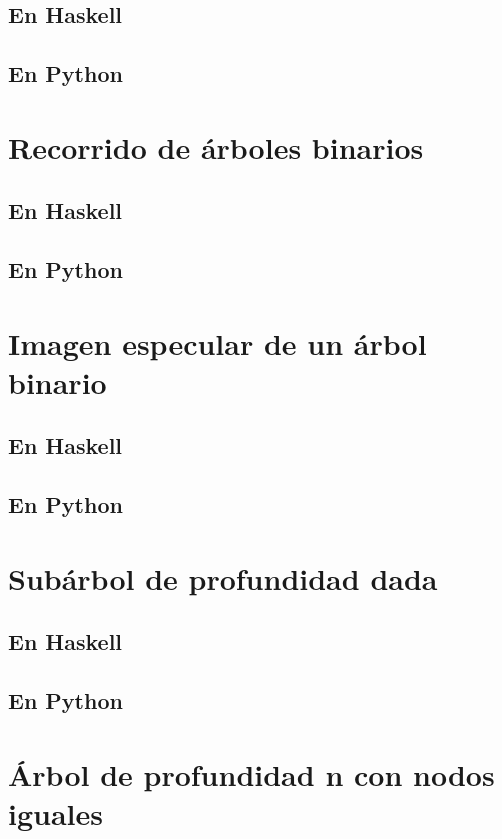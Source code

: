 \documentclass[a4paper,12pt,twoside]{book}
\begin{document}
\subsection{En Haskell}
\subsection*{En Python}

\section{Recorrido de árboles binarios}
\subsection{En Haskell}
\subsection{En Python}

\section{Imagen especular de un árbol binario}
\subsection{En Haskell}
\subsection{En Python}

\section{Subárbol de profundidad dada}
\subsection{En Haskell}
\subsection{En Python}

\section{Árbol de profundidad n con nodos iguales}
\end{document}
